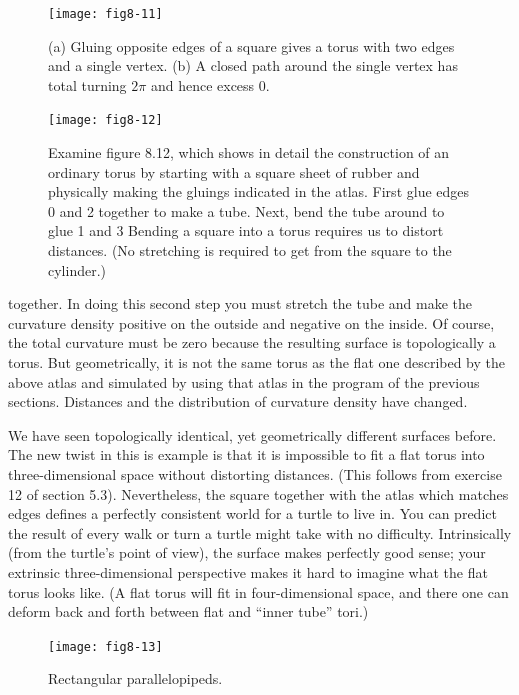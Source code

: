 \documentclass{book}
\begin{document}
\begin{figure}
\begin{center}
\texttt{[image: fig8-11]}
\caption{(a) Gluing opposite edges of a square gives a torus with two edges and a single vertex. (b) A closed path around the single vertex has total turning $2 \pi$ and hence excess 0.}
\end{center}
\end{figure}


\begin{figure}
\begin{center}
\texttt{[image: fig8-12]}
\caption{Examine figure 8.12, which shows in detail the construction of an ordinary torus by starting with a square sheet of rubber and physically making the gluings indicated in the atlas. First glue edges 0 and 2 together to make a tube. Next, bend the tube around to glue 1 and 3 Bending a square into a torus requires us to distort distances. (No stretching is required to get from the square to the cylinder.)}
\end{center}
\end{figure}

together. In doing this second step you must stretch the tube and make
the curvature density positive on the outside and negative on the inside.
Of course, the total curvature must be zero because the resulting surface
is topologically a torus. But geometrically, it is not the same torus as the
flat one described by the above atlas and simulated by using that atlas
in the program of the previous sections. Distances and the distribution
of curvature density have changed.

We have seen topologically identical, yet geometrically different surfaces before. The new twist in this is example is that it is impossible to
fit a flat torus into three-dimensional space without distorting distances.
(This follows from exercise 12 of section 5.3). Nevertheless, the square
together with the atlas which matches edges defines a perfectly consistent world for a turtle to live in. You can predict the result of every
walk or turn a turtle might take with no difficulty. Intrinsically (from
the turtle's point of view), the surface makes perfectly good sense; your
extrinsic three-dimensional perspective makes it hard to imagine what
the flat torus looks like. (A flat torus will fit in four-dimensional space,
and there one can deform back and forth between flat and ``inner tube''
tori.)

\begin{figure}
\begin{center}
\texttt{[image: fig8-13]}
\caption{Rectangular parallelopipeds.}
\end{center}
\end{figure}
\end{document}
